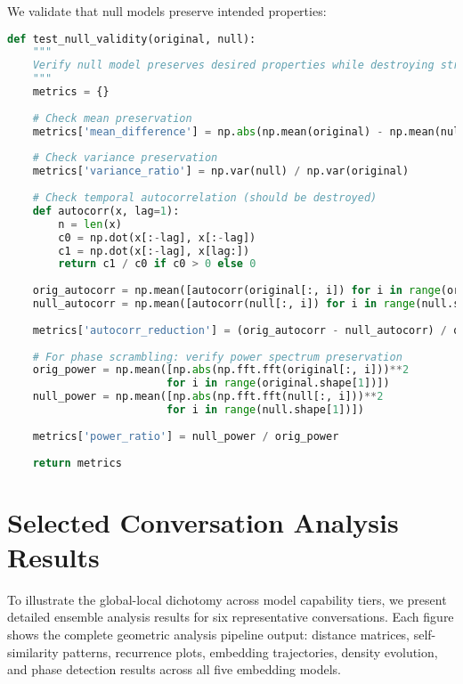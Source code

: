 \documentclass[11pt,letterpaper]{article}
\begin{document}
We validate that null models preserve intended properties:

\begin{lstlisting}[language=Python]
def test_null_validity(original, null):
    """
    Verify null model preserves desired properties while destroying structure.
    """
    metrics = {}
    
    # Check mean preservation
    metrics['mean_difference'] = np.abs(np.mean(original) - np.mean(null))
    
    # Check variance preservation
    metrics['variance_ratio'] = np.var(null) / np.var(original)
    
    # Check temporal autocorrelation (should be destroyed)
    def autocorr(x, lag=1):
        n = len(x)
        c0 = np.dot(x[:-lag], x[:-lag])
        c1 = np.dot(x[:-lag], x[lag:])
        return c1 / c0 if c0 > 0 else 0
    
    orig_autocorr = np.mean([autocorr(original[:, i]) for i in range(original.shape[1])])
    null_autocorr = np.mean([autocorr(null[:, i]) for i in range(null.shape[1])])
    
    metrics['autocorr_reduction'] = (orig_autocorr - null_autocorr) / orig_autocorr
    
    # For phase scrambling: verify power spectrum preservation
    orig_power = np.mean([np.abs(np.fft.fft(original[:, i]))**2 
                         for i in range(original.shape[1])])
    null_power = np.mean([np.abs(np.fft.fft(null[:, i]))**2 
                         for i in range(null.shape[1])])
    
    metrics['power_ratio'] = null_power / orig_power
    
    return metrics
\end{lstlisting}


\section{Selected Conversation Analysis Results}

To illustrate the global-local dichotomy across model capability tiers, we present detailed ensemble analysis results for six representative conversations. Each figure shows the complete geometric analysis pipeline output: distance matrices, self-similarity patterns, recurrence plots, embedding trajectories, density evolution, and phase detection results across all five embedding models.

\afterpage{%
\clearpage
\thispagestyle{empty}

}
\end{document}
